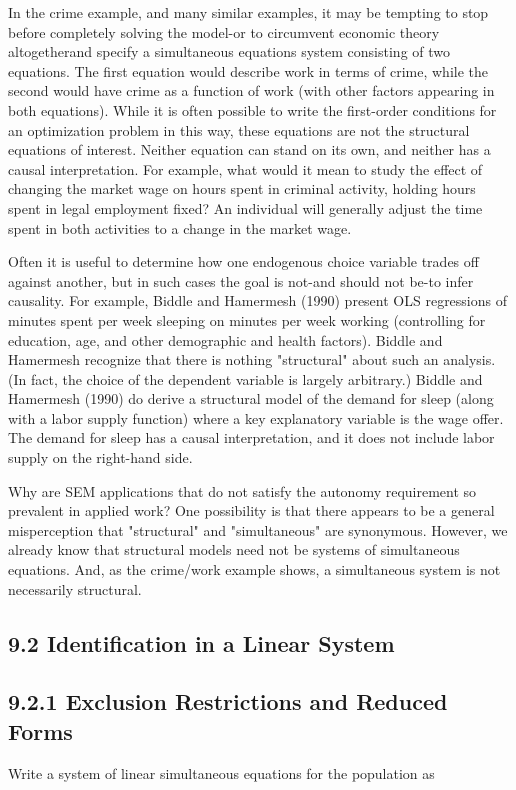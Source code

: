 \documentclass[10pt]{article}
\begin{document}
In the crime example, and many similar examples, it may be tempting to stop before completely solving the model-or to circumvent economic theory altogetherand specify a simultaneous equations system consisting of two equations. The first equation would describe work in terms of crime, while the second would have crime as a function of work (with other factors appearing in both equations). While it is often possible to write the first-order conditions for an optimization problem in this way, these equations are not the structural equations of interest. Neither equation can stand on its own, and neither has a causal interpretation. For example, what would it mean to study the effect of changing the market wage on hours spent in criminal activity, holding hours spent in legal employment fixed? An individual will generally adjust the time spent in both activities to a change in the market wage.

Often it is useful to determine how one endogenous choice variable trades off against another, but in such cases the goal is not-and should not be-to infer causality. For example, Biddle and Hamermesh (1990) present OLS regressions of minutes spent per week sleeping on minutes per week working (controlling for education, age, and other demographic and health factors). Biddle and Hamermesh recognize that there is nothing "structural" about such an analysis. (In fact, the choice of the dependent variable is largely arbitrary.) Biddle and Hamermesh (1990) do derive a structural model of the demand for sleep (along with a labor supply function) where a key explanatory variable is the wage offer. The demand for sleep has a causal interpretation, and it does not include labor supply on the right-hand side.

Why are SEM applications that do not satisfy the autonomy requirement so prevalent in applied work? One possibility is that there appears to be a general misperception that "structural" and "simultaneous" are synonymous. However, we already know that structural models need not be systems of simultaneous equations. And, as the crime/work example shows, a simultaneous system is not necessarily structural.

\subsection*{9.2 Identification in a Linear System}
\subsection*{9.2.1 Exclusion Restrictions and Reduced Forms}
Write a system of linear simultaneous equations for the population as
\end{document}

